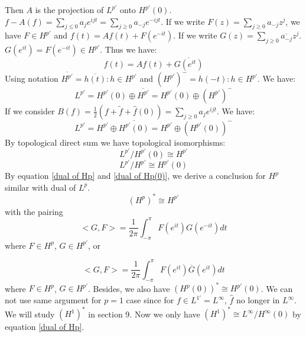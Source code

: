 Then $A$ is the projection of $L^{p'}$ onto $H^{p'}(0)$. $f-A(f)=\sum_{j\leq 0}{a_je^{i j t}}=\sum_{j\geq 0}{a_{-j}e^{-i j t}}$. If we write $F(z)=\sum_{j\geq 0}{a_{-j}z^j}$, we have $F\in H^{p'}$
and $f(t)=Af(t)+F(e^{-it})$. If we write $G(z)=\sum_{j\geq 0}{\overline{a_{-j}}z^j}$. $G(e^{it})=F(e^{-it})\in H^{p'}$. Thus we have:
\begin{equation*}
    f(t)=A f(t)+\overline{G(e^{it})}
\end{equation*}
Using notation $\overline{H^{p'}}={\overline{h(t)}:h\in H^{p'}}$ and $(H^{p'})^-={h(-t):h\in H^{p'}}$. We have:
\begin{equation*}
    L^{p'}=H^{p'}(0)\oplus\overline{H^{p'}}=H^{p'}(0)\oplus (H^{p'})^-
\end{equation*}
If we consider $B(f)=\frac{1}{2}(f+\tilde{f}+\hat{f}(0))=\sum_{j\geq 0}{a_je^{i j t}}$. We have:
\begin{equation*}
    L^{p'}=H^{p'}\oplus\overline{H^{p'}(0)}=H^{p'}\oplus (H^{p'}(0))^-
\end{equation*}
By topological direct sum we have topological isomorphisms:
\begin{equation*}
    L^{p'}/ H^{p'}(0)\cong H^{p'}
\end{equation*}
\begin{equation*}
    L^{p'}/H^{p'}\cong H^{p'}(0)
\end{equation*}
By equation \eqref{dual of Hp} and \eqref{dual of Hp(0)}, we derive a conclusion for $H^p$ similar with dual of $L^p$.
\begin{equation*}
    (H^{p})^*\cong H^{p'}
\end{equation*}
with the pairing
\begin{equation*}
    <G,F>=\frac{1}{2\pi}\int_{-\pi}^{\pi}F(e^{it})G(e^{-it})d t
\end{equation*}
where $F\in H^p$, $G\in H^{p'}$, or

\begin{equation*}
    <G,F>=\frac{1}{2\pi}\int_{-\pi}^{\pi}F(e^{it})\overline G(e^{it})d t
\end{equation*}
where $F\in H^p$, $G\in H^{p'}$. Besides, we also have $(H^{p}(0))^*\cong H^{p'}(0)$.
We can not use same argument for $p=1$ case since for $f\in L^{1'}=L^\infty$, $\hat{f}$ no longer in $L^\infty$. We will study 
$(H^1)^*$ in section 9. Now we only have $(H^1)^*\cong L^{\infty}/ H^{\infty}(0)$ by equation \eqref{dual of Hp}.
% 
